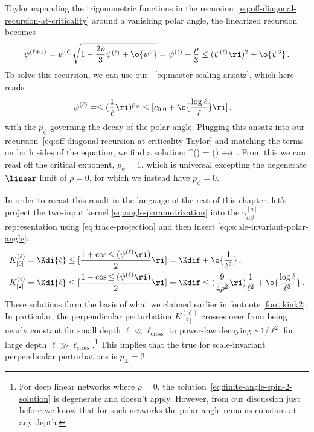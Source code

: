 Taylor expanding the trigonometric functions in the recursion~\eqref{eq:off-diagonal-recursion-at-criticality} around a vanishing polar angle, the linearized recursion becomes
\begin{align}\label{eq:off-diagonal-recursion-at-criticality-Taylor}
\psi^{(\ell+1)}=\psi^{(\ell)}\sqrt{1-\frac{2\rho}{3}\psi^{(\ell)}+\o{\psi^2}}=\psi^{(\ell)}-\frac{\rho}{3}\le(\psi^{(\ell)}\ri)^2+\o{\psi^3}\, .
\end{align}
To solve this recursion, we can use our ~\eqref{eq:master-scaling-ansatz}, which here reads
\begin{align}
\psi^{(\ell)} &= \le( \frac{1}{\ell} \ri)^{p_{\psi}} \le[c_{0,0}+\o{\frac{\log \ell}{\ell}}\ri]\, ,
\end{align} 
with the  $p_{\psi}$ governing the decay of the polar angle. Plugging this ansatz into our recursion~\eqref{eq:off-diagonal-recursion-at-criticality-Taylor} and matching the terms on both sides of the equation, we find a solution:
\be\label{eq:scale-invariant-polar-angle}
\psi^{(\ell)} = \le(\ri)  +\o{}\, .
\ee
From this we can read off the critical exponent, $p_{\psi}=1$, which is universal excepting the degenerate $\linear$ limit of $\rho=0$, for which we instead have $p_{\psi}=0$.

In order to recast this result in the language of the rest of this chapter, let's project the two-input kernel \eqref{eq:angle-parametrization} into the $\gamma^{[a]}_{\alpha\beta}$ representation using \eqref{eq:trace-projection} and then insert \eqref{eq:scale-invariant-polar-angle}:
\begin{align}\label{eq:finite-angle-spin-0-solution}
K_{[0]}^{(\ell)}&=\Kdi{\ell}\le[\frac{1+\cos\!\le(\psi^{(\ell)}\ri)}{2}\ri]=\Kdif+\o{\frac{1}{\ell^2}}\, ,\\
K_{[2]}^{(\ell)}&=\Kdi{\ell}\le[\frac{1-\cos\!\le(\psi^{(\ell)}\ri)}{2}\ri]=\Kdif\le(\frac{9}{4\rho^2}\ri)\frac{1}{\ell^2}+\o{\frac{\log \ell}{\ell^3}}\, .\label{eq:finite-angle-spin-2-solution}
\end{align}
These solutions form the basis of what we claimed earlier in footnote \ref{foot:kink2}.
In particular, the perpendicular perturbation $K_{[2]}^{(\ell)}$ crosses over from being nearly constant for small depth $\ell \ll \ell_{\text{cross}}$ to power-law decaying $\sim1/\ell^2$ for large depth $\ell \gg \ell_{\text{cross}}$.\footnote{
    For deep linear networks where $\rho=0$, the solution~\eqref{eq:finite-angle-spin-2-solution} is degenerate and doesn't apply. However, from our discussion just before we know that for such networks the polar angle remains constant at any depth.
}
This implies that the true  for scale-invariant perpendicular perturbations is $p_\perp=2$.


